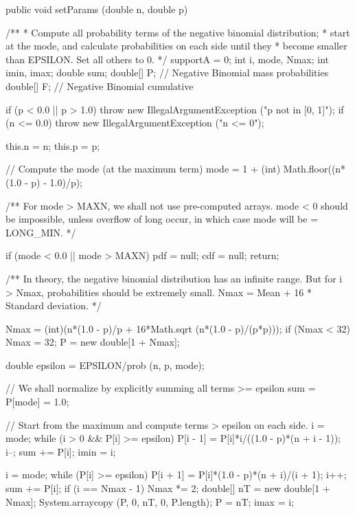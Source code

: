 \begin{code}

   public void setParams (double n, double p)\begin{hide} {
      /**
      *  Compute all probability terms of the negative binomial distribution;
      *  start at the mode, and calculate probabilities on each side until they
      *  become smaller than EPSILON. Set all others to 0.
      */
      supportA = 0;
      int i, mode, Nmax;
      int imin, imax;
      double sum;
      double[] P;     // Negative Binomial mass probabilities
      double[] F;     // Negative Binomial cumulative

      if (p < 0.0 || p > 1.0)
         throw new IllegalArgumentException ("p not in [0, 1]");
      if (n <= 0.0)
         throw new IllegalArgumentException ("n <= 0");

      this.n  = n;
      this.p  = p;

      // Compute the mode (at the maximum term)
      mode = 1 + (int) Math.floor((n*(1.0 - p) - 1.0)/p);

      /**
       For mode > MAXN, we shall not use pre-computed arrays.
       mode < 0 should be impossible, unless overflow of long occur, in
       which case mode will be = LONG_MIN.
      */

      if (mode < 0.0 || mode > MAXN) {
         pdf = null;
         cdf = null;
         return;
      }

      /**
        In theory, the negative binomial distribution has an infinite range.
        But for i > Nmax, probabilities should be extremely small.
        Nmax = Mean + 16 * Standard deviation.
      */

      Nmax = (int)(n*(1.0 - p)/p + 16*Math.sqrt (n*(1.0 - p)/(p*p)));
      if (Nmax < 32)
         Nmax = 32;
      P = new double[1 + Nmax];

      double epsilon = EPSILON/prob (n, p, mode);

      // We shall normalize by explicitly summing all terms >= epsilon
      sum = P[mode] = 1.0;

      // Start from the maximum and compute terms > epsilon on each side.
      i = mode;
      while (i > 0 && P[i] >= epsilon) {
         P[i - 1] = P[i]*i/((1.0 - p)*(n + i - 1));
         i--;
         sum += P[i];
      }
      imin = i;

      i = mode;
      while (P[i] >= epsilon) {
         P[i + 1] = P[i]*(1.0 - p)*(n + i)/(i + 1);
         i++;
         sum += P[i];
         if (i == Nmax - 1) {
            Nmax *= 2;
            double[] nT = new double[1 + Nmax];
            System.arraycopy (P, 0, nT, 0, P.length);
            P = nT;
         }
      }
      imax = i;

}
\end{hide}
\end{code}
